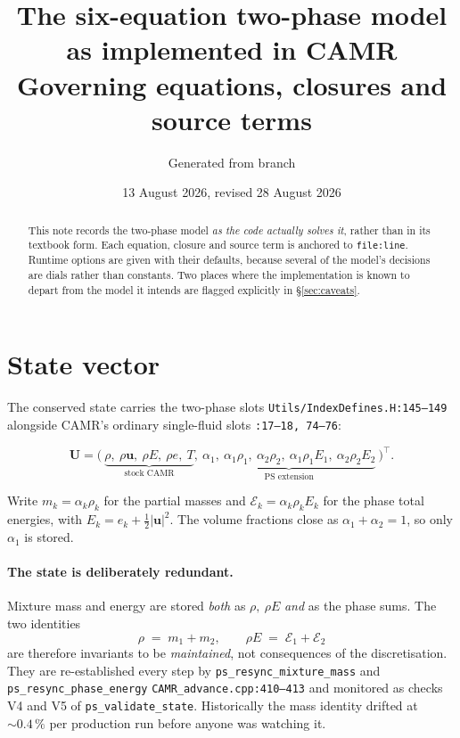 \documentclass[11pt,a4paper]{article}
\title{The six-equation two-phase model as implemented in CAMR\\
       \large Governing equations, closures and source terms}
\author{Generated from \code{CAMR} branch \code{co2-eos}}
\date{13 August 2026, revised 28 August 2026}
\newcommand{\uvec}{\mathbf{u}}
\newcommand{\code}[1]{\texttt{\small #1}}
\newcommand{\src}[1]{{\color{gray}\code{#1}}}
\begin{document}
\maketitle

\begin{abstract}
\noindent
This note records the two-phase model \emph{as the code actually solves it},
rather than in its textbook form.  Each equation, closure and source term is
anchored to \code{file:line}.  Runtime options are given with their defaults,
because several of the model's decisions are dials rather than constants.  Two
places where the implementation is known to depart from the model it intends
are flagged explicitly in \S\ref{sec:caveats}.
\end{abstract}

\section{State vector}

The conserved state carries the two-phase slots
\src{Utils/IndexDefines.H:145--149} alongside CAMR's ordinary single-fluid
slots \src{:17--18,~74--76}:

\begin{equation}
  \mathbf{U} =
  \bigl(\
    \underbrace{\rho,\ \rho\uvec,\ \rho E,\ \rho e,\ T}_{\text{stock CAMR}},\
    \underbrace{\alpha_1,\ \alpha_1\rho_1,\ \alpha_2\rho_2,\
                \alpha_1\rho_1E_1,\ \alpha_2\rho_2E_2}_{\text{PS extension}}\
  \bigr)^{\!\top}.
\end{equation}

Write $m_k=\alpha_k\rho_k$ for the partial masses and
$\mathcal{E}_k=\alpha_k\rho_kE_k$ for the phase total energies, with
$E_k=e_k+\tfrac12|\uvec|^2$.  The volume fractions close as
$\alpha_1+\alpha_2=1$, so only $\alpha_1$ is stored.

\paragraph{The state is deliberately redundant.}
Mixture mass and energy are stored \emph{both} as $\rho,\ \rho E$ \emph{and}
as the phase sums.  The two identities
\begin{equation}
  \rho \;=\; m_1+m_2,
  \qquad
  \rho E \;=\; \mathcal{E}_1+\mathcal{E}_2
  \label{eq:identities}
\end{equation}
are therefore invariants to be \emph{maintained}, not consequences of the
discretisation.  They are re-established every step by
\code{ps\_resync\_mixture\_mass} and \code{ps\_resync\_phase\_energy}
\src{CAMR\_advance.cpp:410--413} and monitored as checks V4 and V5 of
\code{ps\_validate\_state}.  Historically the mass identity drifted at
$\sim\!0.4\,\%$ per production run before anyone was watching it.
\end{document}

